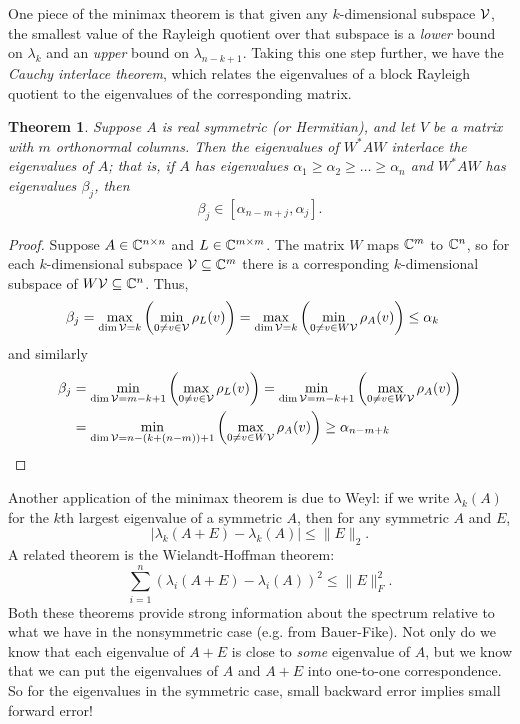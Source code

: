 \documentclass[12pt, leqno]{article} %
\newtheorem{theorem}{Theorem}
\begin{document}
One piece of the minimax theorem is that given any $k$-dimensional subspace
$\mathcal{V}$, the smallest value of the Rayleigh quotient over that
subspace is a {\em lower} bound on $\lambda_k$ and an {\em upper} bound
on $\lambda_{n-k+1}$.  Taking this one step further, we have the {\em Cauchy
interlace theorem}, which relates the eigenvalues of a block Rayleigh quotient
to the eigenvalues of the corresponding matrix.
\begin{theorem}
  Suppose $A$ is real symmetric (or Hermitian), and let $V$ be a
  matrix with $m$ orthonormal columns.  Then the eigenvalues of
  $W^* A W$ interlace the eigenvalues of $A$; that is, if $A$
  has eigenvalues $\alpha_1 \geq \alpha_2 \geq \ldots \geq \alpha_n$
  and $W^* A W$ has eigenvalues $\beta_j$, then
  \[
    \beta_j \in [\alpha_{n-m+j}, \alpha_j].
  \]
\end{theorem}

\begin{proof}
  Suppose $A \in \mathbb{C}^{n \times n}$ and $L \in \mathbb{C}^{m \times m}$.  The matrix
  $W$ maps $\mathbb{C}^{m}$ to $\mathbb{C}^{n}$, so for each $k$-dimensional subspace
  $\mathcal{V} \subseteq \mathbb{C}^{m}$ there is a corresponding
  $k$-dimensional subspace of $W\mathcal{V} \subseteq \mathbb{C}^{n}$.  Thus,
  \begin{align*}
  \beta_j &=
    \max_{\dim \mathcal{V} = k} \left( \min_{0 \neq v \in \mathcal{V}} \rho_L(v) \right)
  = \max_{\dim \mathcal{V} = k} \left( \min_{0 \neq v \in W\mathcal{V}} \rho_A(v) \right)
  \leq \alpha_k
  \end{align*}
  and similarly
  \begin{align*}
  \beta_j &=
    \min_{\dim \mathcal{V} = m-k+1} \left( \max_{0 \neq v \in \mathcal{V}} \rho_L(v) \right)
  =
    \min_{\dim \mathcal{V} = m-k+1} \left( \max_{0 \neq v \in W\mathcal{V}} \rho_A(v) \right) \\
  &=
    \min_{\dim \mathcal{V} = n-(k+(n-m))+1} \left( \max_{0 \neq v \in W\mathcal{V}} \rho_A(v) \right)
   \geq \alpha_{n-m+k}
  \end{align*}
\end{proof}

Another application of the minimax theorem is due to Weyl:
if we write $\lambda_k(A)$ for the $k$th largest eigenvalue of
a symmetric $A$, then for any symmetric $A$ and $E$,
\[
  |\lambda_k(A+E)-\lambda_k(A)| \leq \|E\|_2.
\]
A related theorem is the Wielandt-Hoffman theorem:
\[
  \sum_{i=1}^n (\lambda_i(A+E)-\lambda_i(A))^2 \leq \|E\|_F^2.
\]
Both these theorems provide strong information about the spectrum
relative to what we have in the nonsymmetric case (e.g. from
Bauer-Fike).  Not only do we know that each eigenvalue of $A+E$ is
close to {\em some} eigenvalue of $A$, but we know that we can put the
eigenvalues of $A$ and $A+E$ into one-to-one correspondence.  So for
the eigenvalues in the symmetric case, small backward error implies
small forward error!
\end{document}

